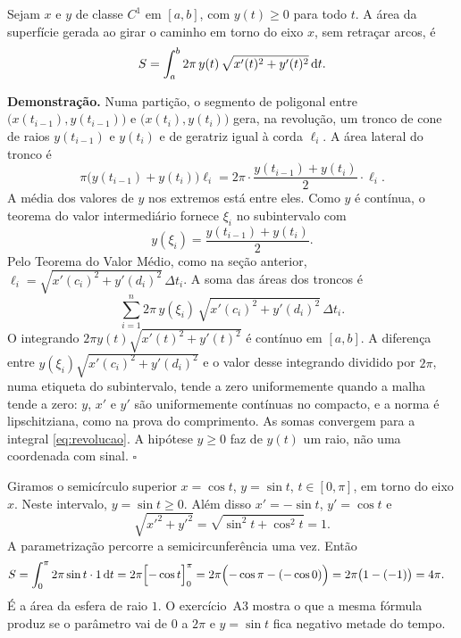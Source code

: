 \documentclass[11pt,a4paper]{article}
\begin{document}
\begin{teorema}
Sejam \(x\) e \(y\) de classe \(C^1\) em \([a,b]\), com \(y(t)\ge 0\) para todo \(t\). A área da superfície gerada ao girar o caminho em torno do eixo \(x\), sem retraçar arcos, é
\begin{equation}
S=\int_{a}^{b} 2\pi\, y(t)\,\sqrt{x'(t)^{2}+y'(t)^{2}}\,\mathrm{d} t.
\label{eq:revolucao}
\end{equation}
\end{teorema}

\noindent\textbf{Demonstração.}
Numa partição, o segmento de poligonal entre \(\bigl(x(t_{i-1}),y(t_{i-1})\bigr)\) e \(\bigl(x(t_{i}),y(t_{i})\bigr)\) gera, na revolução, um tronco de cone de raios \(y(t_{i-1})\) e \(y(t_{i})\) e de geratriz igual à corda \(\ell_{i}\). A área lateral do tronco é
\[
\pi\bigl(y(t_{i-1})+y(t_{i})\bigr)\ell_{i}
=2\pi\cdot\frac{y(t_{i-1})+y(t_{i})}{2}\cdot\ell_{i}.
\]
A média dos valores de \(y\) nos extremos está entre eles. Como \(y\) é contínua, o teorema do valor intermediário fornece \(\xi_{i}\) no subintervalo com
\[
y(\xi_{i})=\frac{y(t_{i-1})+y(t_{i})}{2}.
\]
Pelo Teorema do Valor Médio, como na seção anterior, \(\ell_{i}=\sqrt{x'(c_{i})^{2}+y'(d_{i})^{2}}\,\Delta t_{i}\). A soma das áreas dos troncos é
\[
\sum_{i=1}^{n} 2\pi\, y(\xi_{i})\,\sqrt{x'(c_{i})^{2}+y'(d_{i})^{2}}\,\Delta t_{i}.
\]
O integrando \(2\pi y(t)\sqrt{x'(t)^{2}+y'(t)^{2}}\) é contínuo em \([a,b]\). A diferença entre \(y(\xi_{i})\sqrt{x'(c_{i})^{2}+y'(d_{i})^{2}}\) e o valor desse integrando dividido por \(2\pi\), numa etiqueta do subintervalo, tende a zero uniformemente quando a malha tende a zero: \(y\), \(x'\) e \(y'\) são uniformemente contínuas no compacto, e a norma é lipschitziana, como na prova do comprimento. As somas convergem para a integral \eqref{eq:revolucao}. A hipótese \(y\ge 0\) faz de \(y(t)\) um raio, não uma coordenada com sinal.
\hfill\(\square\)

\begin{exemplo}
Giramos o semicírculo superior \(x=\cos t\), \(y=\sin t\), \(t\in[0,\pi]\), em torno do eixo \(x\). Neste intervalo, \(y=\sin t\ge 0\). Além disso \(x'=-\sin t\), \(y'=\cos t\) e
\[
\sqrt{x'^{2}+y'^{2}}=\sqrt{\sin^{2}t+\cos^{2}t}=1.
\]
A parametrização percorre a semicircunferência uma vez. Então
\begin{align*}
S
&=\int_{0}^{\pi} 2\pi\sin t\cdot 1\,\mathrm{d} t
=2\pi\Bigl[-\cos t\Bigr]_{0}^{\pi}
=2\pi\Bigl(-\cos\pi-(-\cos 0)\Bigr)
=2\pi\bigl(1-(-1)\bigr)
=4\pi.
\end{align*}
É a área da esfera de raio \(1\). O exercício~A3 mostra o que a mesma fórmula produz se o parâmetro vai de \(0\) a \(2\pi\) e \(y=\sin t\) fica negativo metade do tempo.
\end{exemplo}
\end{document}

